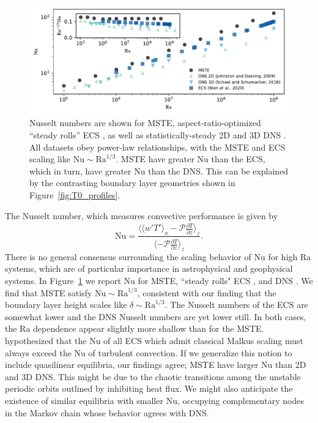 \documentclass[reprint,amsmath,amssymb,aps,nofootinbib]{revtex4-1}
\newcommand\Ra{\mathrm{Ra}}
\newcommand\Nu{\mathrm{Nu}}
\begin{document}
\begin{figure}
    \centering
    \includegraphics[width=7.1in]{nu_ra.pdf}
    \caption{Nusselt numbers are shown for MSTE, aspect-ratio-optimized ``steady rolls'' ECS \cite{Wen}, as well as statistically-steady 2D and 3D DNS \cite{Johnston, Scheel_2016}.
    All datasets obey power-law relationships, with the MSTE and ECS scaling like $\Nu \sim\Ra^{1/3}$. 
    MSTE have greater $\Nu$ than the ECS, which in turn, have greater $\Nu$ than the DNS. 
    This can be explained by the contrasting boundary layer geometries shown in Figure~\ref{fig:T0_profiles}.}%
    \label{fig:nu_vs_ra}%
\end{figure}


The Nusselt number, which measures convective performance is given by
\begin{equation}
    \Nu = \frac{\langle \langle w'T' \rangle_x - \mathcal{P}\frac{\partial \overline{T}}{\partial z} \rangle_z}{\langle- \mathcal{P}\frac{\partial \overline{T}}{\partial z} \rangle_z}.
\end{equation}
There is no general consensus surrounding the scaling behavior of $\Nu$ for high $\Ra$ systems, which are of particular importance in astrophysical and geophysical systems. In Figure~\ref{fig:nu_vs_ra} we report $\Nu$ for MSTE, ``steady rolls" ECS \cite{Wen}, and DNS \cite{Scheel_2016, Johnston}. 
We find that MSTE satisfy $\Nu \sim\Ra^{1/3}$, consistent with our finding that the boundary layer height scales like $\delta \sim \Ra^{1/3}$.
The Nusselt numbers of the ECS are somewhat lower and the DNS Nusselt numbers are yet lower still.
In both cases, the $\Ra$ dependence appear slightly more shallow than for the MSTE.
\cite{Wen} hypothesized that the $\Nu$ of all ECS which admit classical Malkus scaling must always exceed the $\Nu$ of turbulent convection.
If we generalize this notion to include quasilinear equilibria, our findings agree; MSTE have larger $\Nu$ than 2D and 3D DNS.
This might be due to the chaotic transitions among the unstable periodic orbits outlined by \cite{Yalniz, Cvitanovic} inhibiting heat flux. 
We might also anticipate the existence of similar equilibria with smaller $\Nu$, occupying complementary nodes in the Markov chain whose behavior agrees with DNS. 
\end{document}
